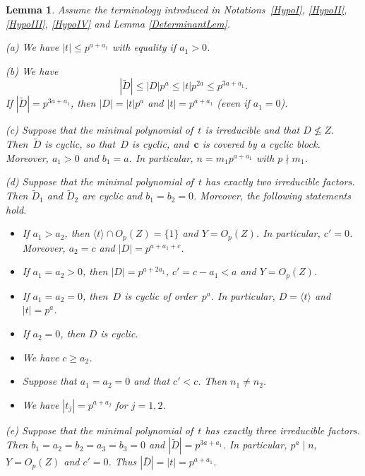 \documentclass[12pt]{amsart}
\newcommand{\bc}{{\mathbf{c}}}
\newtheorem{lem}[thm]{Lemma}
\theoremstyle{theorem}
\theoremstyle{definition}
\theoremstyle{remark}
\begin{document}
\begin{lem}
\label{AnalysingTheDeltas}
Assume the terminology introduced in 
{\rm Notations~\ref{HypoI}, \ref{HypoII}, \ref{HypoIII}, \ref{HypoIV}} and 
{\rm Lemma \ref{DeterminantLem}}.

{\rm (a)} We have $|t| \leq p^{a + a_1}$ with equality if $a_1 > 0$. 

{\rm (b)} We have
\begin{equation}
\label{EstimatingTildeD}
|\tilde{D}| \leq |D|p^a \leq |t|p^{2a} \leq p^{3a + a_1}.
\end{equation}
If $|\tilde{D}| = p^{3a + a_1}$, then $|D| = |t|p^a$ and $|t| = p^{a+a_1}$
(even if $a_1 = 0$).

{\rm (c)} Suppose that the minimal polynomial of~$t$ is irreducible and that
$D \not\leq Z$. 
Then~$\tilde{D}$ is cyclic, so that~$D$ is cyclic, and~$\bc$ is covered by a 
cyclic block. Moreover, $a_1 > 0$ and $b_1 = a$. In particular, 
$n = m_1 p^{a+a_1}$ with $p \nmid m_1$.

{\rm (d)} Suppose that the minimal polynomial of~$t$ has exactly 
two irreducible factors. Then $\tilde{D}_1$ and $\tilde{D}_2$ are cyclic and
$b_1 = b_2 = 0$. Moreover, the following statements hold.

\begin{itemize} 
\item[(i)] If $a_1 > a_2$, then $\langle t \rangle \cap O_p(Z) = \{ 1 \}$ and
$Y = O_p(Z)$. In particular, $c' = 0$. Moreover, $a_2 = c$ and 
$|D| = p^{a + a_1 + c}$.

\item[(ii)] If $a_1 = a_2 > 0$, then $|D| = p^{a + 2a_1}$,
$c' = c - a_1 < a$ and $Y = O_p(Z)$. 

\item[(iii)] If $a_1 = a_2 = 0$, then~$D$ is cyclic of order~$p^a$. In particular,
$D = \langle t \rangle$ and $|t| = p^a$.

\item[(iv)] If $a_2 = 0$, then $D$ is cyclic.

\item[(v)] We have $c \geq a_2$.

\item[(vi)] Suppose that $a_1 = a_2 = 0$ and that $c' < c$. 
Then $n_1 \neq n_2$.

\item[(vii)] We have $|t_j| = p^{a+a_j}$ for $j = 1, 2$.
\end{itemize}

{\rm (e)} Suppose that the minimal polynomial of~$t$ has exactly
three irreducible factors. Then $b_1 = a_2 = b_2 = a_3 = b_3 = 0$ and 
$|\tilde{D}| = p^{3a + a_1}$. In particular, $p^a \mid n$, $Y = O_p(Z)$
and $c' = 0$.
Thus $|\bar{D}| = |t| = p^{a+a_1}$.


\end{lem}
\end{document}
